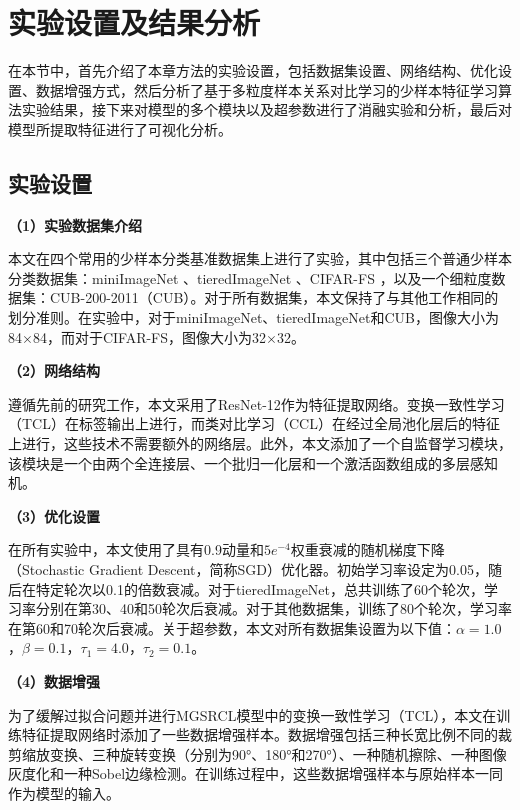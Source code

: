 \section[\hspace{-2pt}实验设置及结果分析]{{\heiti{} \hspace{-8pt}实验设置及结果分析}}\label{section3: 实验设置及结果分析}
在本节中，首先介绍了本章方法的实验设置，包括数据集设置、网络结构、优化设置、数据增强方式，然后分析了基于多粒度样本关系对比学习的少样本特征学习算法实验结果，接下来对模型的多个模块以及超参数进行了消融实验和分析，最后对模型所提取特征进行了可视化分析。

\subsection[\hspace{-2pt}实验设置]{{\heiti{} \hspace{-8pt}实验设置}}\label{section3: 实验设置}

\textbf{（1）实验数据集介绍}

本文在四个常用的少样本分类基准数据集上进行了实验，其中包括三个普通少样本分类数据集：miniImageNet \cite{vinyals2016matching}、tieredImageNet \cite{ren2018meta}、CIFAR-FS \cite{bertinetto2018meta}，以及一个细粒度数据集：CUB-200-2011（CUB）\cite{wah2011caltech}。对于所有数据集，本文保持了与其他工作\cite{RFS, RENet, IER}相同的划分准则。在实验中，对于miniImageNet、tieredImageNet和CUB，图像大小为84$\times$84，而对于CIFAR-FS，图像大小为32$\times$32。

\textbf{（2）网络结构}

遵循先前的研究工作\cite{RFS, DeepEMD, IER}，本文采用了ResNet-12作为特征提取网络。变换一致性学习（TCL）在标签输出上进行，而类对比学习（CCL）在经过全局池化层后的特征上进行，这些技术不需要额外的网络层。此外，本文添加了一个自监督学习模块，该模块是一个由两个全连接层、一个批归一化层和一个激活函数组成的多层感知机。

\textbf{（3）优化设置}

在所有实验中，本文使用了具有0.9动量和$5e^{-4}$权重衰减的随机梯度下降（Stochastic Gradient Descent，简称SGD）优化器。初始学习率设定为0.05，随后在特定轮次以0.1的倍数衰减。对于tieredImageNet，总共训练了60个轮次，学习率分别在第30、40和50轮次后衰减。对于其他数据集，训练了80个轮次，学习率在第60和70轮次后衰减。关于超参数，本文对所有数据集设置为以下值：$\alpha=1.0$，$\beta=0.1$，$\tau_1=4.0$，$\tau_2=0.1$。

\textbf{（4）数据增强}

为了缓解过拟合问题并进行MGSRCL模型中的变换一致性学习（TCL），本文在训练特征提取网络时添加了一些数据增强样本。数据增强包括三种长宽比例不同的裁剪缩放变换、三种旋转变换（分别为90°、180°和270°）、一种随机擦除、一种图像灰度化和一种Sobel边缘检测。在训练过程中，这些数据增强样本与原始样本一同作为模型的输入。

